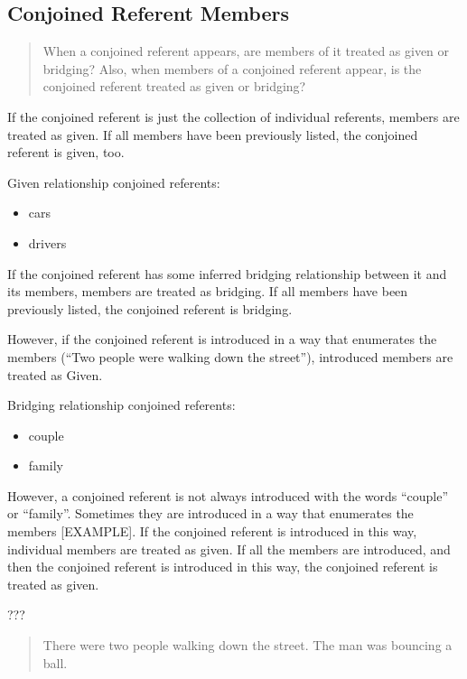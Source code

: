 \documentclass[
]{book}
\providecommand{\tightlist}{%
  \setlength{\itemsep}{0pt}\setlength{\parskip}{0pt}}
\begin{document}
\hypertarget{conjoined-referent-members}{%
\subsection{Conjoined Referent Members}\label{conjoined-referent-members}}

\begin{quote}
When a conjoined referent appears, are members of it treated as given or bridging?
Also, when members of a conjoined referent appear, is the conjoined referent treated as given or bridging?
\end{quote}

If the conjoined referent is just the collection of individual referents, members are treated as given.
If all members have been previously listed, the conjoined referent is given, too.

Given relationship conjoined referents:

\begin{itemize}
\tightlist
\item
  cars
\item
  drivers
\end{itemize}

If the conjoined referent has some inferred bridging relationship between it and its members, members are treated as bridging.
If all members have been previously listed, the conjoined referent is bridging.

However, if the conjoined referent is introduced in a way that enumerates the members (``Two people were walking down the street''),
introduced members are treated as Given.

Bridging relationship conjoined referents:

\begin{itemize}
\tightlist
\item
  couple
\item
  family
\end{itemize}

However, a conjoined referent is not always introduced with the words ``couple'' or ``family''.
Sometimes they are introduced in a way that enumerates the members {[}EXAMPLE{]}.
If the conjoined referent is introduced in this way, individual members are treated as given.
If all the members are introduced, and then the conjoined referent is introduced in this way, the conjoined referent is treated as given.

???

\begin{quote}
There were two people walking down the street.
The man was bouncing a ball.
\end{quote}
\end{document}
